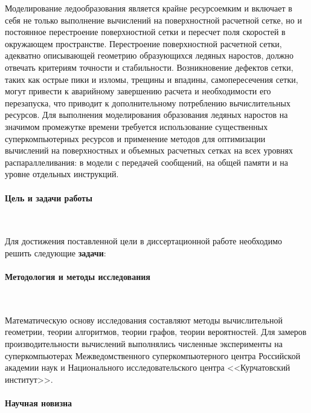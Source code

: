 \documentclass[a4paper,14pt]{extarticle}                     %
\theoremstyle{plain}                                         %
\begin{document}
Моделирование ледообразования является крайне ресурсоемким и включает в себя не только выполнение вычислений на поверхностной расчетной сетке, но и постоянное перестроение поверхностной сетки и пересчет поля скоростей в окружающем пространстве.
Перестроение поверхностной расчетной сетки, адекватно описывающей геометрию образующихся ледяных наростов, должно отвечать критериям точности и стабильности.
Возникновение дефектов сетки, таких как острые пики и изломы, трещины и впадины, самопересечения сетки, могут привести к аварийному завершению расчета и необходимости его перезапуска, что приводит к дополнительному потреблению вычислительных ресурсов. 
Для выполнения моделирования образования ледяных наростов на значимом промежутке времени требуется использование существенных суперкомпьютерных ресурсов и применение методов для оптимизации вычислений на поверхностных и объемных расчетных сетках на всех уровнях распараллеливания: в модели с передачей сообщений, на общей памяти и на уровне отдельных инструкций.

\paragraph{Цель и задачи работы}

\



Для достижения поставленной цели в диссертационной работе необходимо решить следующие \textbf{задачи}:
\begin{enumerate}[noitemsep,topsep=0pt,parsep=0pt,partopsep=0pt]

\end{enumerate}

\paragraph{Методология и методы исследования}

\

Математическую основу исследования составляют методы вычислительной геометрии, теории алгоритмов, теории графов, теории вероятностей.
Для замеров производительности вычислений выполнялись численные эксперименты на суперкомпьютерах Межведомственного суперкомпьютерного центра Российской академии наук и Национального исследовательского центра <<Курчатовский институт>>.

\paragraph{Научная новизна}
\end{document}
